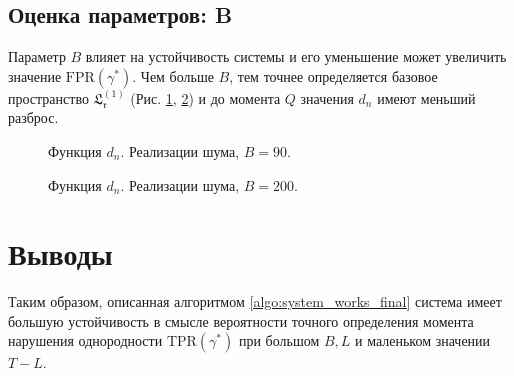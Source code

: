 \documentclass[specialist, substylefile = spbu.rtx,
			   subf, href, 12pt]{disser}
\begin{document}
\newpage
\subsection{Оценка параметров: B}
Параметр $ B $ влияет на устойчивость системы и его уменьшение может увеличить значение $ \mathrm{FPR}(\gamma^*) $. Чем больше $ B $, тем точнее определяется базовое пространство $ \mathfrak{L_r^{(1)}} $ (Рис. \ref{pic:row_diff_small_B}, \ref{pic:row_diff_big_B}) и до момента $ Q $ значения $ d_n $ имеют меньший разброс.
\begin{figure}[!hhh]
	\caption{Функция $ d_n $. Реализации шума, $ B=90 $.}
	\label{pic:row_diff_small_B}
\end{figure}

\begin{figure}[!hhh]
	\caption{Функция $ d_n $. Реализации шума, $ B=200 $.}
	\label{pic:row_diff_big_B}
\end{figure}


\section{Выводы}
Таким образом, описанная алгоритмом \ref{algo:system_works_final} система имеет большую устойчивость в смысле вероятности точного определения момента нарушения однородности $ \mathrm{TPR}(\gamma^*) $ при большом $ B, L $ и маленьком значении $ T - L $.
\end{document}
